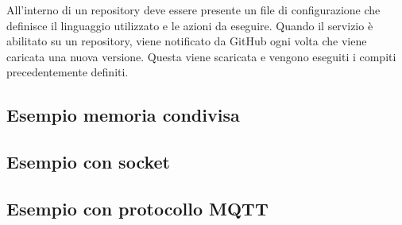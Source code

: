 All'interno di un repository deve essere presente un file di configurazione che
definisce il linguaggio utilizzato e le azioni da eseguire. Quando il servizio è
abilitato su un repository, viene notificato da GitHub ogni volta che viene
caricata una nuova versione. Questa viene scaricata e vengono eseguiti i compiti
precedentemente definiti.


\subsection{Esempio memoria condivisa}

\subsection{Esempio con socket}

\subsection{Esempio con protocollo MQTT}